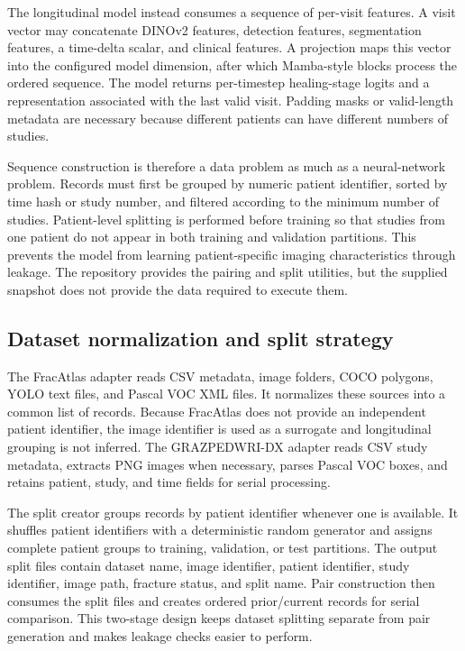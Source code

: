 \documentclass[12pt,a4paper]{article}
\begin{document}
The longitudinal model instead consumes a sequence of per-visit features. A visit vector may concatenate DINOv2 features, detection features, segmentation features, a time-delta scalar, and clinical features. A projection maps this vector into the configured model dimension, after which Mamba-style blocks process the ordered sequence. The model returns per-timestep healing-stage logits and a representation associated with the last valid visit. Padding masks or valid-length metadata are necessary because different patients can have different numbers of studies.

Sequence construction is therefore a data problem as much as a neural-network problem. Records must first be grouped by numeric patient identifier, sorted by time hash or study number, and filtered according to the minimum number of studies. Patient-level splitting is performed before training so that studies from one patient do not appear in both training and validation partitions. This prevents the model from learning patient-specific imaging characteristics through leakage. The repository provides the pairing and split utilities, but the supplied snapshot does not provide the data required to execute them.

\subsection{Dataset normalization and split strategy}
The FracAtlas adapter reads CSV metadata, image folders, COCO polygons, YOLO text files, and Pascal VOC XML files. It normalizes these sources into a common list of records. Because FracAtlas does not provide an independent patient identifier, the image identifier is used as a surrogate and longitudinal grouping is not inferred. The GRAZPEDWRI-DX adapter reads CSV study metadata, extracts PNG images when necessary, parses Pascal VOC boxes, and retains patient, study, and time fields for serial processing.

The split creator groups records by patient identifier whenever one is available. It shuffles patient identifiers with a deterministic random generator and assigns complete patient groups to training, validation, or test partitions. The output split files contain dataset name, image identifier, patient identifier, study identifier, image path, fracture status, and split name. Pair construction then consumes the split files and creates ordered prior/current records for serial comparison. This two-stage design keeps dataset splitting separate from pair generation and makes leakage checks easier to perform.
\end{document}
